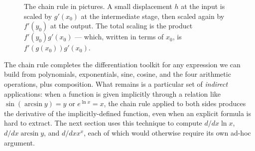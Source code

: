 \begin{figure}[H]
\centering
{}
\caption{The chain rule in pictures. A small displacement \(h\) at the input is scaled by \(g'(x_{0})\) at the intermediate stage, then scaled again by \(f'(y_{0})\) at the output. The total scaling is the product \(f'(y_{0}) g'(x_{0})\) --- which, written in terms of \(x_{0}\), is \(f'(g(x_{0})) g'(x_{0})\).}
\label{fig:chain-rule-mapping}
\end{figure}

The chain rule completes the differentiation toolkit for any expression we can build from polynomials, exponentials, sine, cosine, and the four arithmetic operations, plus composition. What remains is a particular set of \emph{indirect} applications: when a function is given implicitly through a relation like \(\sin(\arcsin y) = y\) or \(e^{\ln x} = x\), the chain rule applied to both sides produces the derivative of the implicitly-defined function, even when an explicit formula is hard to extract. The next section uses this technique to compute \(d/dx \ln x\), \(d/dx \arcsin y\), and \(d/dx x^{x}\), each of which would otherwise require its own ad-hoc argument.

